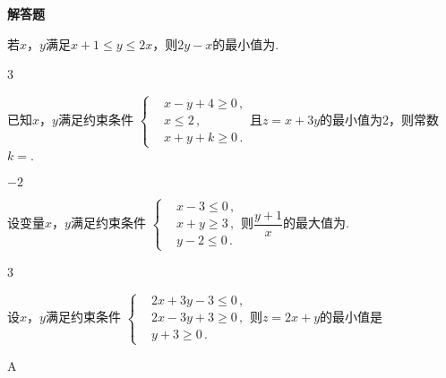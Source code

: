 \begin{exercise}{\bf 解答题}
\begin{exercise}
      若$x$，$y$满足$x+1\leqslant y\leqslant 2x$，则$2y-x$的最小值为\tk.
      \begin{answer}
        3
      \end{answer}
    \item %
      已知$x$，$y$满足约束条件
      $\left\{\begin{aligned}
        &x-y+4\geqslant0\,,\\
        &x\leqslant2\,,\\
        &x+y+k\geqslant0\,.
      \end{aligned}\right.$且$z=x+3y$的最小值为2，则常数$k=$\tk.
      \begin{answer}
        $-2$
      \end{answer}
    \item %
      设变量$x$，$y$满足约束条件
      $\left\{\begin{aligned}
        &x-3\leqslant0\,,\\
        &x+y\geqslant3\,,\\
        &y-2\leqslant0\,.
      \end{aligned}\right.$则$\dfrac{y+1}{x}$的最大值为\tk.
      \begin{answer}
        3
      \end{answer}
    \item %
      设$x$，$y$满足约束条件
      $\left\{\begin{aligned}
        &2x+3y-3\leqslant0\,,\\
        &2x-3y+3\geqslant0\,,\\
        &y+3\geqslant0\,.
      \end{aligned}\right.$则$z=2x+y$的最小值是\xz
      \begin{answer}
        A
      \end{answer}
    \item %

\end{exercise}
\end{exercise}
